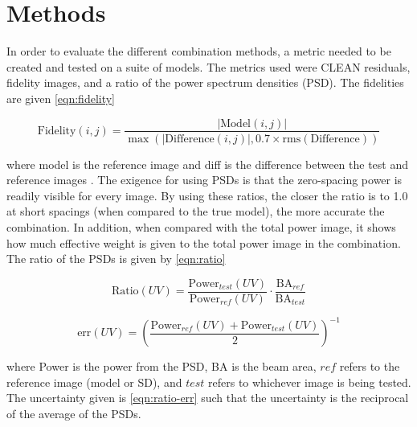 \documentclass[manuscript,linenumbers]{aastex62}
\begin{document}

\section{Methods}

In order to evaluate the different combination methods, a metric needed to be created and tested on a suite of models. The metrics used were CLEAN residuals, fidelity images, and a ratio of the power spectrum densities (PSD). The fidelities are given \autoref{eqn:fidelity} 
 
\begin{equation}
    \text{Fidelity}(i, j) = \frac{|\text{Model}(i, j)|}{\max{\left(|\text{Difference}(i, j)|, 0.7\times\text{rms}(\text{Difference})\right)}}
    \label{eqn:fidelity}
\end{equation} 

where model is the reference image and diff is the difference between the test and reference images \citep[p.19]{almamemo}. The exigence for using PSDs is that the zero-spacing power is readily visible for every image. By using these ratios, the closer the ratio is to 1.0 at short spacings (when compared to the true model), the more accurate the combination. In addition, when compared with the total power image, it shows how much effective weight is given to the total power image in the combination. The ratio of the PSDs is given by \autoref{eqn:ratio}

\begin{equation}
    \text{Ratio}(UV) = \frac{\text{Power}_{test}(UV)}{\text{Power}_{ref}(UV)} \cdot \frac{\text{BA}_{ref}}{\text{BA}_{test}}
    \label{eqn:ratio}
\end{equation} 

\begin{equation}
    \text{err}(UV) = \left(\frac{\text{Power}_{ref}(UV)+ \text{Power}_{test}(UV)}{2}\right)^{-1}
    \label{eqn:ratio-err}
\end{equation} 

where Power is the power from the PSD, BA is the beam area, $ref$ refers to the reference image (model or SD), and $test$ refers to whichever image is being tested. The uncertainty given is \autoref{eqn:ratio-err} such that the uncertainty is the reciprocal of the average of the PSDs. 
\end{document}
